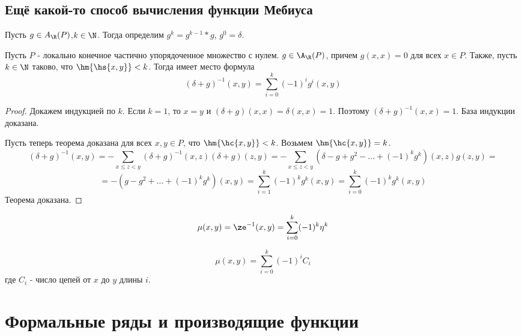 \documentclass[unicode,10pt]{article}
\begin{document}
\subsection{Ещё какой-то способ вычисления функции Мебиуса}
\begin{df}
  Пусть $g\in A_\R(P)$,$k\in\N$. Тогда определим $g^k=g^{k-1}\ast g$, $g^0=\delta$.
\end{df}
\begin{theorem}
  Пусть $P$ - локально конечное частично упорядоченное множество с нулем.
  $g\in\A_\R(P)$, причем $g(x,x) =0 $ для всех $x\in P$. Также, пусть $k\in\N$ таково,
  что $\hm{\hs{x,y}}<k$. Тогда имеет место формула
  \begin{displaymath}
    (\delta+g)^{-1}(x,y) = \sum_{i=0}^k(-1)^ig^i(x,y)
  \end{displaymath}
\end{theorem}
\begin{proof}
  Докажем индукцией по $k$.
  Если $k=1$, то $x=y$ и $(\delta+g)(x,x) = \delta(x,x) =1$.
  Поэтому $(\delta+g)^{-1}(x,x) = 1$. База индукции доказана.


  Пусть теперь теорема доказана для всех $x,y\in P$, что $\hm{\hc{x,y}}<k$. Возьмем
  $\hm{\hc{x,y}}=k$.
  \begin{displaymath}
    (\delta+g)^{-1}(x,y) = -\sum_{x\le z<y}(\delta+g)^{-1}(x,z)(\delta+g)(z,y) =
    -\sum_{x\le z<y}(\delta-g+g^2-\dots+(-1)^kg^k)(x,z)g(z,y) =
  \end{displaymath}
  \begin{displaymath}
    = -(g-g^2+\dots+(-1)^kg^k)(x,y)=\sum_{i=1}^k (-1)^kg^k(x,y)=\sum_{i=0}^k (-1)^kg^k(x,y)
  \end{displaymath}
  Теорема доказана.
\end{proof}
\begin{imp}
  \begin{displaymath}
    \mu(x,y)=\ze^{-1}(x,y)=\sum^k_{i=0}(-1)^k\eta^k
  \end{displaymath}
\end{imp}
\begin{imp}
  \begin{displaymath}
    \mu(x,y) = \sum^k_{i=0}(-1)^iC_i
  \end{displaymath}
  где $C_i$ - число цепей от $x$ до $y$ длины $i$.\WHY
\end{imp}
\section{Формальные ряды и производящие функции}
\end{document}
